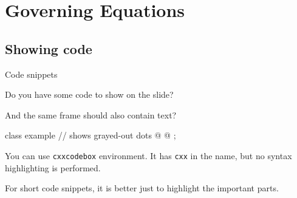 {
\begin{frame}[plain]

\end{frame}
}

\section{Governing Equations}

	\subsection{Showing code}
	
		\begin{xframe}{Code snippets}
		
		    Do you have some code to show on the slide?
		
		    And the same frame should also contain text?
		
		    \begin{cxxcodebox}
		        class example {
		            // \codedots shows grayed-out dots
		            @ \codedots @
		        };
		    \end{cxxcodebox}
		
		    You can use \verb|cxxcodebox| environment.
		    It has \verb|cxx| in the name,
		    but no syntax highlighting is performed.
		
		    For short code snippets,
		    it is better just to highlight the important parts.
		
		\end{xframe}


